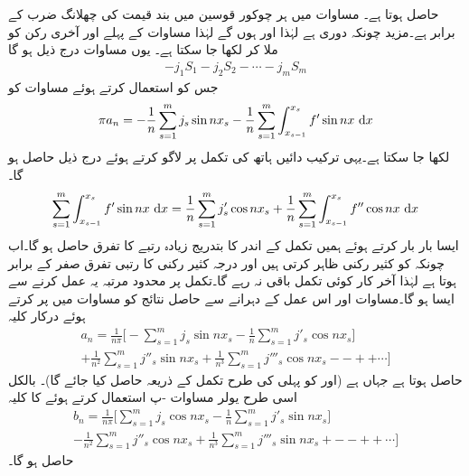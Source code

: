 حاصل ہوتا ہے۔ مساوات  میں ہر چوکور قوسین میں بند قیمت  کی چھلانگ ضرب  کے برابر ہے۔مزید چونکہ  دوری ہے لہٰذا  اور  ہوں گے لہٰذا مساوات  کے پہلے اور آخری رکن کو ملا کر  لکھا جا سکتا ہے۔ یوں مساوات  درج ذیل ہو گا
\begin{align*}
-j_1S_1-j_2S_2-\cdots -j_mS_m
\end{align*}
جس کو استعمال کرتے ہوئے مساوات  کو
\begin{align}\label{مساوات_فوریئر_بائیں_دائیں_حد_ث}
\pi a_n=-\frac{1}{n}\sum_{s=1}^{m} j_s\sin nx_s-\frac{1}{n}\sum_{s=1}^{m}\int_{x_{s-1}}^{x_s}f' \sin nx\,\dif x
\end{align}
لکھا جا سکتا ہے۔یہی ترکیب دائیں ہاتھ کی تکمل پر لاگو کرتے ہوئے درج ذیل حاصل ہو گا۔
\begin{align}\label{مساوات_فوریئر_بائیں_دائیں_حد_ج}
\sum_{s=1}^{m}\int_{x_{s-1}}^{x_s} f'\sin nx\, \dif x=\frac{1}{n} \sum_{s=1}^{m}j'_s\cos nx_s+\frac{1}{n}\sum_{s=1}^{m} \int_{x_{s-1}}^{x_s} f''\cos nx\,\dif x
\end{align}
ایسا بار بار کرتے ہوئے ہمیں  تکمل کے اندر  کا بتدریج  زیادہ رتبے کا  تفرق حاصل ہو گا۔اب چونکہ  کو کثیر رکنی ظاہر کرتی ہیں اور درجہ  کثیر رکنی کا  رتبی تفرق صفر کے برابر ہوتا ہے لہٰذا  آخر کار  کوئی تکمل باقی نہ رہے گا۔تکمل پر محدود مرتبہ یہ عمل کرنے سے ایسا ہو گا۔مساوات  اور اس عمل کے دہرانے سے حاصل نتائج کو مساوات  میں پر کرتے ہوئے درکار کلیہ
\begin{multline}\label{مساوات_فوریئر_چھلانگ_عددی_سر_الف}
a_n=\frac{1}{n\pi}\big[-\sum_{s=1}^{m} j_s\sin nx_s-\frac{1}{n}\sum_{s=1}^{m} j'_s \cos nx_s]\\
+\frac{1}{n^2} \sum_{s=1}^{m} j''_s\sin nx_s+\frac{1}{n^3}\sum_{s=1}^{m} j'''_s\cos nx_s--++\cdots \big]
\end{multline}
حاصل ہوتا ہے جہاں  ہے (اور  کو پہلی کی طرح تکمل کے ذریعہ حاصل کیا جائے گا)۔ بالکل اسی طرح یولر مساوات -پ استعمال کرتے ہوئے  کا کلیہ
\begin{multline}\label{مساوات_فوریئر_چھلانگ_عددی_سر_ب}
b_n=\frac{1}{n\pi}\big[\sum_{s=1}^{m} j_s\cos nx_s-\frac{1}{n}\sum_{s=1}^{m} j'_s \sin nx_s]\\
-\frac{1}{n^2} \sum_{s=1}^{m} j''_s\cos nx_s+\frac{1}{n^3}\sum_{s=1}^{m} j'''_s\sin nx_s+--++\cdots \big]
\end{multline}
حاصل ہو گا۔

